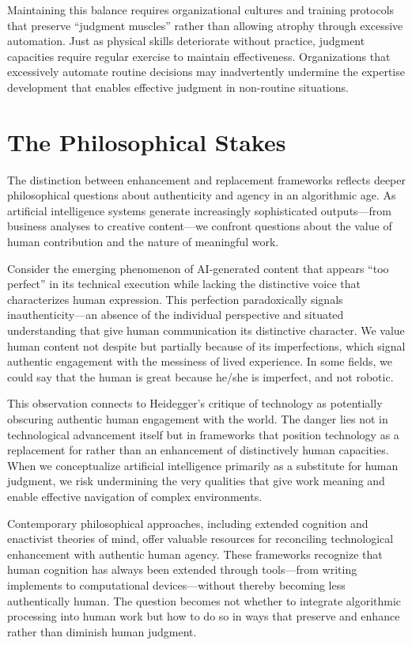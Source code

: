 \documentclass[
  Letterpaper,
]{scrbook}
\begin{document}
Maintaining this balance requires organizational cultures and training
protocols that preserve ``judgment muscles'' rather than allowing
atrophy through excessive automation. Just
as physical skills deteriorate without practice, judgment capacities
require regular exercise to maintain effectiveness. Organizations that
excessively automate routine decisions may inadvertently undermine the
expertise development that enables effective judgment in non-routine
situations.

\section{The Philosophical Stakes}\label{the-philosophical-stakes}

The distinction between enhancement and replacement frameworks reflects
deeper philosophical questions about
authenticity and agency in an algorithmic
age. As artificial intelligence systems generate increasingly
sophisticated outputs---from business analyses to creative content---we
confront questions about the value of human contribution and the nature
of meaningful work.

Consider the emerging phenomenon of AI-generated content that appears
``too perfect'' in its technical execution while lacking the distinctive
voice that characterizes human expression. This perfection paradoxically
signals inauthenticity---an absence of the individual perspective and
situated understanding that give human communication its distinctive
character. We value human content not despite but partially because of
its imperfections, which signal authentic engagement with the messiness
of lived experience. In some fields, we could say that the human is
great because he/she is imperfect, and not robotic.

This observation connects to Heidegger's critique of technology as
potentially obscuring authentic human engagement with the world. The
danger lies not in technological advancement itself but in frameworks
that position technology as a replacement for rather than an enhancement
of distinctively human capacities. When we conceptualize artificial
intelligence primarily as a substitute for human judgment, we risk
undermining the very qualities that give work meaning and enable
effective navigation of complex environments.

Contemporary philosophical approaches, including extended cognition and
enactivist theories of mind, offer valuable resources for reconciling
technological enhancement with authentic human
agency. These frameworks
recognize that human cognition has always been extended through
tools---from writing implements to computational devices---without
thereby becoming less authentically human. The question becomes not
whether to integrate algorithmic processing into human work but how to
do so in ways that preserve and enhance rather than diminish human
judgment.
\end{document}
